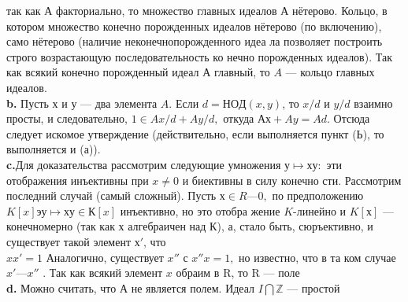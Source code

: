 так как $А$ факториально, то множество главных идеалов $А$ нётерово.\linebreak
Кольцо, в котором множество конечно порожденных идеалов нётерово\linebreak
(по включению), само нётерово (наличие неконечнопорожденного идеа­\linebreak
ла позволяет построить строго возрастающую последовательность ко­\linebreak
нечно порожденных идеалов). Так как всякий конечно порожденный\linebreak
идеал $А$ главный, то $A$ --- кольцо главных идеалов.\\
\hspace*{15pt}\textbf{b.} Пусть $х$ и $у$ --- два элемента $A$. Если $d = НОД(x,y)$, то $x/d$\linebreak
и $y/d$ взаимно просты, и следовательно, $1 \in Ax/d + Ay/d,$ откуда\linebreak
$Ах + Ay = Ad$. Отсюда следует искомое утверждение (действительно,\linebreak
если выполняется пункт ($Ь$), то выполняется и ($а$)).\\
\hspace*{15pt}\textbf{c.}Для доказательства рассмотрим следующие умножения $у \mapsto ху:$\linebreak
эти отображения инъективны при $x \neq 0$ и биективны в силу конечно­\linebreak
сти. Рассмотрим последний случай (самый сложный). Пусть $х \in R —{0},$\linebreak
по предположению $K[x] э у \mapsto ху \in К[x]$ инъективно, но это отобра­\linebreak
жение $K$-линейно и $K[х]$ — конечномерно (так как х алгебраичен над\linebreak
К), а, стало быть, сюръективно, и существует такой элемент $х'$, что\\
\newpage
\noindent $xx' = 1 $ Аналогично, существует $x''$ с $x''x = 1,$ но известно, что в та­\linebreak
ком случае $x' — x''$ . Так как всякий элемент $x$ обраим в R, то R ---\linebreak
поле\\
\hspace*{15pt}\textbf{d.}  Можно считать, что А не является полем. Идеал $I\bigcap\mathbb{Z}$ — простой\linebreak
